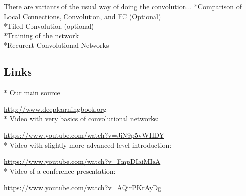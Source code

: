 \documentclass[]{article}
\begin{document}
There are variants of the usual way of doing the convolution...
\newline
*Comparison of Local Connections, Convolution, and FC (Optional)\\
*Tiled Convolution (optional)\\
*Training of the network\\
*Recurent Convolutional Networks









\subsection{Links}
* Our main source:

\url{http://www.deeplearningbook.org}\\
* Video with very basics of convolutional networks:

\url{https://www.youtube.com/watch?v=JiN9p5vWHDY}\\
* Video with slightly more advanced level introduction:

\url{https://www.youtube.com/watch?v=FmpDIaiMIeA}\\
* Video of a conference presentation:

\url{https://www.youtube.com/watch?v=AQirPKrAyDg}
\end{document}
